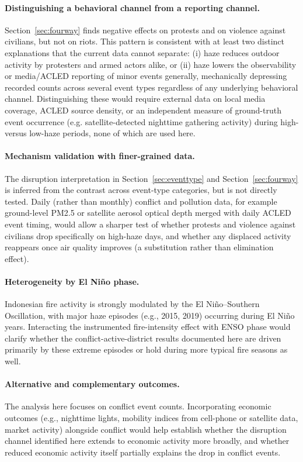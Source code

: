 \documentclass[12pt]{article}
\begin{document}
\paragraph{Distinguishing a behavioral channel from a reporting channel.} Section~\ref{sec:fourway} finds negative effects on protests and on violence against civilians, but not on riots. This pattern is consistent with at least two distinct explanations that the current data cannot separate: (i) haze reduces outdoor activity by protesters and armed actors alike, or (ii) haze lowers the observability or media/ACLED reporting of minor events generally, mechanically depressing recorded counts across several event types regardless of any underlying behavioral channel. Distinguishing these would require external data on local media coverage, ACLED source density, or an independent measure of ground-truth event occurrence (e.g. satellite-detected nighttime gathering activity) during high- versus low-haze periods, none of which are used here.

\paragraph{Mechanism validation with finer-grained data.} The disruption interpretation in Section~\ref{sec:eventtype} and Section~\ref{sec:fourway} is inferred from the contrast across event-type categories, but is not directly tested. Daily (rather than monthly) conflict and pollution data, for example ground-level PM2.5 or satellite aerosol optical depth merged with daily ACLED event timing, would allow a sharper test of whether protests and violence against civilians drop specifically on high-haze days, and whether any displaced activity reappears once air quality improves (a substitution rather than elimination effect).

\paragraph{Heterogeneity by El Ni\~{n}o phase.} Indonesian fire activity is strongly modulated by the El Ni\~{n}o--Southern Oscillation, with major haze episodes (e.g., 2015, 2019) occurring during El Ni\~{n}o years. Interacting the instrumented fire-intensity effect with ENSO phase would clarify whether the conflict-active-district results documented here are driven primarily by these extreme episodes or hold during more typical fire seasons as well.

\paragraph{Alternative and complementary outcomes.} The analysis here focuses on conflict event counts. Incorporating economic outcomes (e.g., nighttime lights, mobility indices from cell-phone or satellite data, market activity) alongside conflict would help establish whether the disruption channel identified here extends to economic activity more broadly, and whether reduced economic activity itself partially explains the drop in conflict events.
\end{document}
